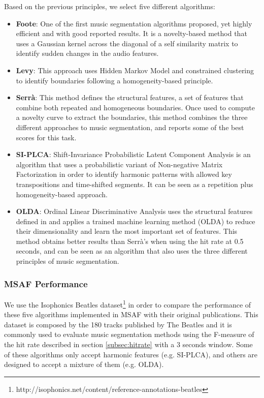 \documentclass{article}
\begin{document}
Based on the previous principles, we select five different algorithms:

\begin{itemize}
  \item
    \textbf{Foote}: One of the first music segmentation algorithms proposed, yet highly efficient and with good reported results\cite{Foote1999}. It is a novelty-based method that uses a Gaussian kernel across the diagonal of a self similarity matrix to identify sudden changes in the audio features.
  \item
    \textbf{Levy}: This approach uses Hidden Markov Model and constrained clustering to identify boundaries following a homogeneity-based principle\cite{Levy2008}.
  \item
    \textbf{Serr\`a}: This method defines the structural features, a set of features that combine both repeated and homogeneous boundaries. Once used to compute a novelty curve to extract the boundaries, this method combines the three different approaches to music segmentation, and reports some of the best scores for this task\cite{Serra2013}.
  \item
    \textbf{SI-PLCA}: Shift-Invariance Probabilistic Latent Component Analysis is an algorithm that uses a probabilistic variant of Non-negative Matrix Factorization in order to identify harmonic patterns with allowed key transpositions and time-shifted segments\cite{Weiss2011}. It can be seen as a repetition plus homogeneity-based approach.
  \item 
    \textbf{OLDA}: Ordinal Linear Discriminative Analysis uses the structural features defined in \cite{Serra2013} and applies a trained machine learning method (OLDA) to reduce their dimensionality and learn the most important set of features\cite{McFee2014}. This method obtains better results than Serr\`a's when using the hit rate at 0.5 seconds, and can be seen as an algorithm that also uses the three different principles of music segmentation.
\end{itemize}

\subsubsection{MSAF Performance}\label{subsub:performance}

We use the Isophonics Beatles dataset\footnote{http://isophonics.net/content/reference-annotations-beatles} in order to compare the performance of these five algorithms implemented in MSAF with their original publications. 
This dataset is composed by the 180 tracks published by The Beatles and it is commonly used to evaluate music segmentation methods using the F-measure of the hit rate described in section \ref{subsec:hitrate} with a 3 seconds window.
Some of these algorithms only accept harmonic features (e.g. SI-PLCA), and others are designed to accept a mixture of them (e.g. OLDA).
\end{document}
